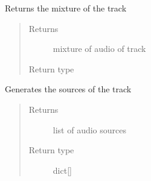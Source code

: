 \documentclass[letterpaper,10pt,english]{sphinxmanual}
\begin{document}
\begin{fulllineitems}
\begin{fulllineitems}
\begin{quote}
\begin{description}
\end{description}\end{quote}

\end{fulllineitems}


\begin{fulllineitems}
\label{\detokenize{docs/source/preprocess:preprocess.track_classes.Track.mixture}}
Returns the mixture of the track
\begin{quote}\begin{description}
\item[{Returns}] \leavevmode
{} \textendash{} mixture of audio of track

\item[{Return type}] \leavevmode
{\hyperref[\detokenize{docs/source/preprocess:preprocess.track_classes.Audio}]{}}

\end{description}\end{quote}

\end{fulllineitems}


\begin{fulllineitems}
\label{\detokenize{docs/source/preprocess:preprocess.track_classes.Track.sources}}
Generates the sources of the track
\begin{quote}\begin{description}
\item[{Returns}] \leavevmode
{} \textendash{} list of audio sources

\item[{Return type}] \leavevmode
dict{[}{\hyperref[\detokenize{docs/source/preprocess:preprocess.track_classes.Audio}]{}}{]}

\end{description}\end{quote}

\end{fulllineitems}


\end{fulllineitems}
\end{document}
